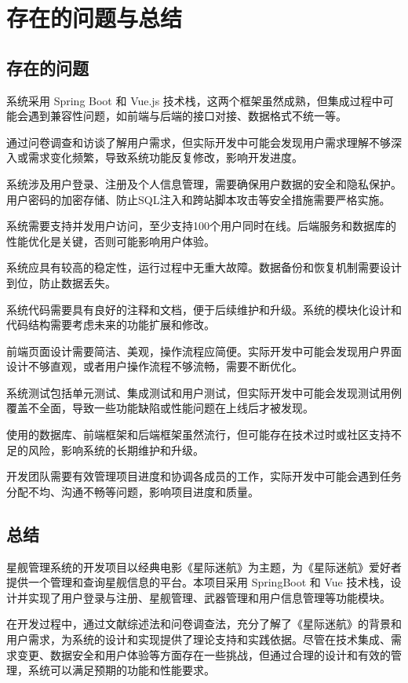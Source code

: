 \documentclass{base}
\begin{document}
\section{存在的问题与总结}

\subsection{存在的问题}

系统采用 Spring Boot 和 Vue.js 技术栈，这两个框架虽然成熟，但集成过程中可能会遇到兼容性问题，如前端与后端的接口对接、数据格式不统一等。

通过问卷调查和访谈了解用户需求，但实际开发中可能会发现用户需求理解不够深入或需求变化频繁，导致系统功能反复修改，影响开发进度。

系统涉及用户登录、注册及个人信息管理，需要确保用户数据的安全和隐私保护。用户密码的加密存储、防止SQL注入和跨站脚本攻击等安全措施需要严格实施。

系统需要支持并发用户访问，至少支持100个用户同时在线。后端服务和数据库的性能优化是关键，否则可能影响用户体验。

系统应具有较高的稳定性，运行过程中无重大故障。数据备份和恢复机制需要设计到位，防止数据丢失。

系统代码需要具有良好的注释和文档，便于后续维护和升级。系统的模块化设计和代码结构需要考虑未来的功能扩展和修改。

前端页面设计需要简洁、美观，操作流程应简便。实际开发中可能会发现用户界面设计不够直观，或者用户操作流程不够流畅，需要不断优化。

系统测试包括单元测试、集成测试和用户测试，但实际开发中可能会发现测试用例覆盖不全面，导致一些功能缺陷或性能问题在上线后才被发现。

使用的数据库、前端框架和后端框架虽然流行，但可能存在技术过时或社区支持不足的风险，影响系统的长期维护和升级。

开发团队需要有效管理项目进度和协调各成员的工作，实际开发中可能会遇到任务分配不均、沟通不畅等问题，影响项目进度和质量。

\subsection{总结}

星舰管理系统的开发项目以经典电影《星际迷航》为主题，为《星际迷航》爱好者提供一个管理和查询星舰信息的平台。本项目采用 SpringBoot 和 Vue 技术栈，设计并实现了用户登录与注册、星舰管理、武器管理和用户信息管理等功能模块。

在开发过程中，通过文献综述法和问卷调查法，充分了解了《星际迷航》的背景和用户需求，为系统的设计和实现提供了理论支持和实践依据。尽管在技术集成、需求变更、数据安全和用户体验等方面存在一些挑战，但通过合理的设计和有效的管理，系统可以满足预期的功能和性能要求。
\end{document}
